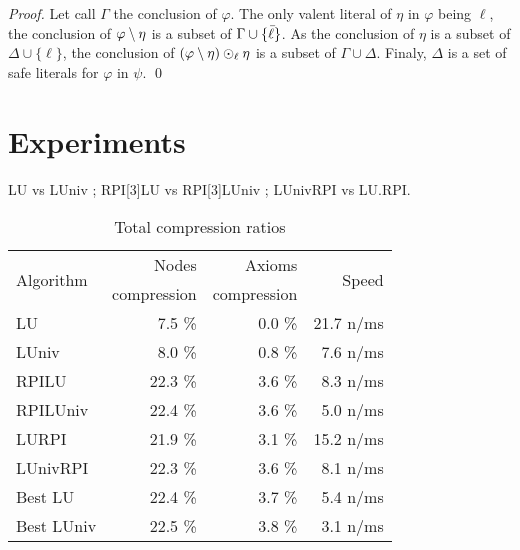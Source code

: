 \documentclass{llncs}
\begin{document}
\begin{proof}
Let call $\Gamma$ the conclusion of $\varphi$.  The only valent literal of $\eta$ in $\varphi$ being
$\ell$, the conclusion of $\varphi \setminus \eta$ is a subset of $\Gamma \cup \{\bar{\ell}\}$. As the
conclusion of $\eta$ is a subset of $\Delta \cup \{\ell\}$, the conclusion of $\left(
\varphi \setminus \eta \right) \odot_\ell \eta$ is a subset of $\Gamma \cup \Delta$. Finaly, $\Delta$ is
a set of safe literals for $\varphi$ in $\psi$. \qed
\end{proof}


\section{Experiments}

\begin{jb}
LU vs LUniv ; RPI[3]LU vs RPI[3]LUniv ; LUnivRPI vs LU.RPI.
\end{jb}


\begin{table}[ht]
  \centering
  \begin{tabular}{lrrr}
    \toprule
    \multirow{2}{*}{Algorithm} & Nodes       & Axioms      & \multirow{2}{*}{Speed} \\
                               & compression & compression & \\
    \midrule
    LU         &  7.5 \% &  0.0 \% & 21.7 n/ms \\
    LUniv      &  8.0 \% &  0.8 \% &  7.6 n/ms \\
    RPILU      & 22.3 \% &  3.6 \% &  8.3 n/ms \\
    RPILUniv   & 22.4 \% &  3.6 \% &  5.0 n/ms \\
    LURPI      & 21.9 \% &  3.1 \% & 15.2 n/ms \\
    LUnivRPI   & 22.3 \% &  3.6 \% &  8.1 n/ms \\
    Best LU    & 22.4 \% &  3.7 \% &  5.4 n/ms \\
    Best LUniv & 22.5 \% &  3.8 \% &  3.1 n/ms \\
    \bottomrule
  \end{tabular}
  \caption{Total compression ratios}
\end{table}
\end{document}

